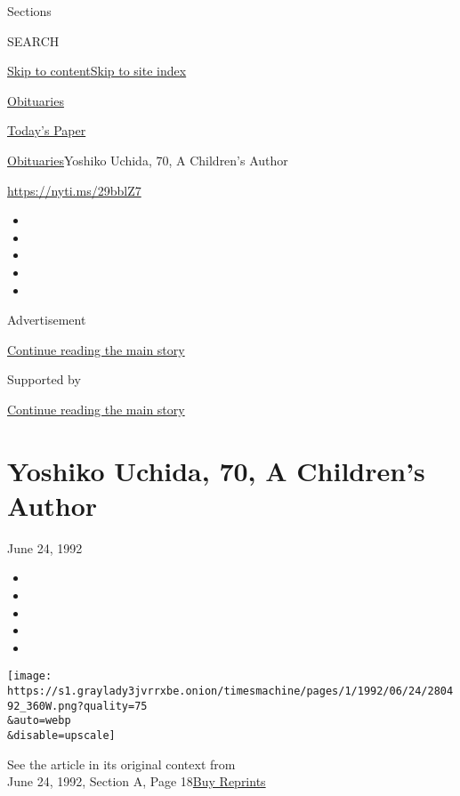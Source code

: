 Sections

SEARCH

\protect\hyperlink{site-content}{Skip to
content}\protect\hyperlink{site-index}{Skip to site index}

\href{https://www.nytimes3xbfgragh.onion/section/obituaries}{Obituaries}

\href{https://myaccount.nytimes3xbfgragh.onion/auth/login?response_type=cookie\&client_id=vi}{}

\href{https://www.nytimes3xbfgragh.onion/section/todayspaper}{Today's
Paper}

\href{/section/obituaries}{Obituaries}\textbar{}Yoshiko Uchida, 70, A
Children's Author

\url{https://nyti.ms/29bblZ7}

\begin{itemize}
\item
\item
\item
\item
\item
\end{itemize}

Advertisement

\protect\hyperlink{after-top}{Continue reading the main story}

Supported by

\protect\hyperlink{after-sponsor}{Continue reading the main story}

\hypertarget{yoshiko-uchida-70-a-childrens-author}{%
\section{Yoshiko Uchida, 70, A Children's
Author}\label{yoshiko-uchida-70-a-childrens-author}}

June 24, 1992

\begin{itemize}
\item
\item
\item
\item
\item
\end{itemize}

\texttt{[image: https://s1.graylady3jvrrxbe.onion/timesmachine/pages/1/1992/06/24/280492\_360W.png?quality=75\\\&auto=webp\\\&disable=upscale]}

See the article in its original context from\\
June 24, 1992, Section A, Page
18\href{https://store.nytimes3xbfgragh.onion/collections/new-york-times-page-reprints?utm_source=nytimes\&utm_medium=article-page\&utm_campaign=reprints}{Buy
Reprints}


